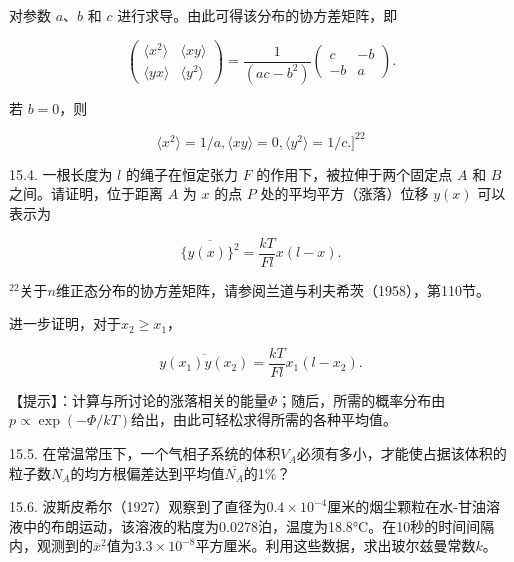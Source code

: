 对参数 \(a\)、\(b\) 和 \(c\) 进行求导。由此可得该分布的协方差矩阵，即

\begin{equation}\tag{15.6.65}\label{eq:15.6.65}
\begin{pmatrix}\langle x^2\rangle&\langle xy\rangle\\\langle yx\rangle&\langle y^2\rangle\end{pmatrix}=\frac1{(ac-b^2)}\begin{pmatrix}c&-b\\-b&a\end{pmatrix}.
\end{equation}

若 \(b=0\)，则

\begin{equation}\tag{15.6.66}\label{eq:15.6.66}
\langle x ^{2} \rangle = 1 / a ,  \langle x y \rangle = 0 ,  \langle y ^{2} \rangle = 1 / c . ] ^{22}
\end{equation}

15.4. 一根长度为 \(l\) 的绳子在恒定张力 \(F\) 的作用下，被拉伸于两个固定点 \(A\) 和 \(B\) 之间。请证明，位于距离 \(A\) 为 \(x\) 的点 \(P\) 处的平均平方（涨落）位移 \(y(x)\) 可以表示为

\begin{equation}\tag{15.6.67}\label{eq:15.6.67}
\overline { { \{ y ( x ) \} ^{2} } } = \frac { k T } { F l } x ( l - x ) .
\end{equation}

\(^{22}\)关于\(n\)维正态分布的协方差矩阵，请参阅兰道与利夫希茨（1958），第110节。

进一步证明，对于\(x_{2} \geq x_{1}\)，

\begin{equation}\tag{15.6.68}\label{eq:15.6.68}
\overline { { y ( x _ { 1 } ) y ( x _ { 2 } ) } } = \frac { k T } { F l } x _ { 1 } ( l - x _ { 2 } ) .
\end{equation}

【提示】：计算与所讨论的涨落相关的能量\(\Phi\)；随后，所需的概率分布由\(p \propto \exp(-\Phi/kT)\)给出，由此可轻松求得所需的各种平均值。

15.5. 在常温常压下，一个气相子系统的体积\(V_A\)必须有多小，才能使占据该体积的粒子数\(N_A\)的均方根偏差达到平均值\(\overline{N_A}\)的1\%？

15.6. 波斯皮希尔（1927）观察到了直径为\(0.4 \times 10^{-4}\)厘米的烟尘颗粒在水-甘油溶液中的布朗运动，该溶液的粘度为0.0278泊，温度为18.8°C。在10秒的时间间隔内，观测到的\(\overline{x}^2\)值为\(3.3 \times 10^{-8}\)平方厘米。利用这些数据，求出玻尔兹曼常数\(k\)。

